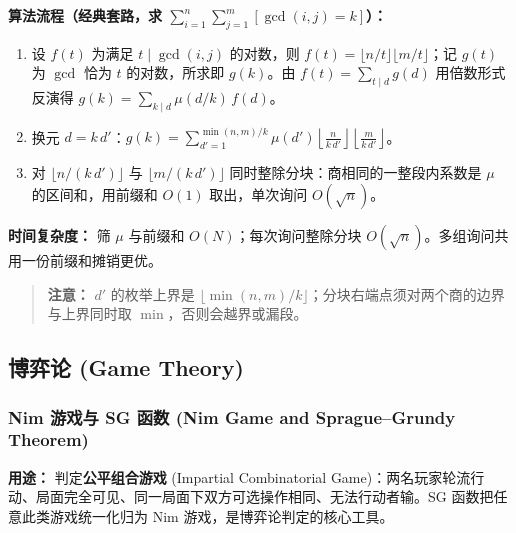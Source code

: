 \textbf{算法流程（经典套路，求 $\sum_{i=1}^{n}\sum_{j=1}^{m}[\gcd(i,j)=k]$）：}
\begin{enumerate}
    \item 设 $f(t)$ 为满足 $t\mid\gcd(i,j)$ 的对数，则 $f(t)=\lfloor n/t\rfloor\lfloor m/t\rfloor$；记 $g(t)$ 为 $\gcd$ 恰为 $t$ 的对数，所求即 $g(k)$。由 $f(t)=\sum_{t\mid d}g(d)$ 用倍数形式反演得 $g(k)=\sum_{k\mid d}\mu(d/k)\,f(d)$。
    \item 换元 $d=k\,d'$：$g(k)=\sum_{d'=1}^{\min(n,m)/k}\mu(d')\left\lfloor\frac{n}{k\,d'}\right\rfloor\left\lfloor\frac{m}{k\,d'}\right\rfloor$。
    \item 对 $\lfloor n/(k\,d')\rfloor$ 与 $\lfloor m/(k\,d')\rfloor$ 同时整除分块：商相同的一整段内系数是 $\mu$ 的区间和，用前缀和 $O(1)$ 取出，单次询问 $O(\sqrt{n})$。
\end{enumerate}

\textbf{时间复杂度：} 筛 $\mu$ 与前缀和 $O(N)$；每次询问整除分块 $O(\sqrt{n})$。多组询问共用一份前缀和摊销更优。

\begin{quote}
\textbf{注意：} $d'$ 的枚举上界是 $\lfloor\min(n,m)/k\rfloor$；分块右端点须对两个商的边界与上界同时取 $\min$，否则会越界或漏段。
\end{quote}



\subsection{博弈论 (Game Theory)}

\subsubsection{Nim 游戏与 SG 函数 (Nim Game and Sprague--Grundy Theorem)}

\textbf{用途：}  
判定\textbf{公平组合游戏} (Impartial Combinatorial Game)：两名玩家轮流行动、局面完全可见、同一局面下双方可选操作相同、无法行动者输。SG 函数把任意此类游戏统一化归为 Nim 游戏，是博弈论判定的核心工具。

